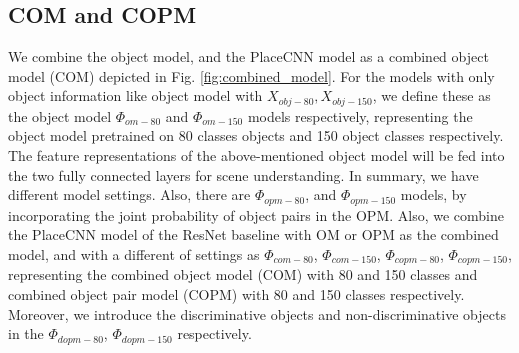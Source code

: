 \subsection{\textbf{COM and COPM}}

We combine the object model, and the PlaceCNN model as a combined object model (COM) depicted in Fig. \ref{fig:combined_model}. For the models with only object information like object model with $X_{obj-80},X_{obj-150}$, we define these as the object model $\Phi_{om-80}$ and $\Phi_{om-150}$ models respectively, representing the object model pretrained on 80 classes objects and 150 object classes respectively.
The feature representations of the above-mentioned object model will be fed into the two fully connected layers for scene understanding. In summary, we have different model settings. Also, there are $\Phi_{opm-80}$, and $\Phi_{opm-150}$ models, by incorporating the joint probability of object pairs in the OPM. Also, we combine the PlaceCNN model of the ResNet baseline with OM or OPM as the combined model, and with a different of settings as $\Phi_{com-80}$, $\Phi_{com-150}$, $\Phi_{copm-80}$, $\Phi_{copm-150}$, representing the combined object model (COM) with 80 and 150 classes and combined object pair model (COPM) with 80 and 150 classes respectively. Moreover, we introduce the discriminative objects and non-discriminative objects in the $\Phi_{dopm-80}$, $\Phi_{dopm-150}$ respectively.

